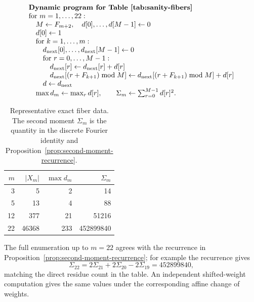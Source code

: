 \[
\begin{array}{l}
\text{\bf Dynamic program for Table~\ref{tab:sanity-fibers}}\\
\text{for }m=1,\ldots,22:\\
\quad M\leftarrow F_{m+2},\quad d[0],\ldots,d[M-1]\leftarrow0\\
\quad d[0]\leftarrow1\\
\quad \text{for }k=1,\ldots,m:\\
\quad\quad d_{\rm next}[0],\ldots,d_{\rm next}[M-1]\leftarrow0\\
\quad\quad \text{for }r=0,\ldots,M-1:\\
\quad\quad\quad d_{\rm next}[r]\leftarrow d_{\rm next}[r]+d[r]\\
\quad\quad\quad d_{\rm next}[(r+F_{k+1})\bmod M]
\leftarrow d_{\rm next}[(r+F_{k+1})\bmod M]+d[r]\\
\quad\quad d\leftarrow d_{\rm next}\\
\quad \max d_m\leftarrow \max_r d[r],\qquad
\Sigma_m\leftarrow\sum_{r=0}^{M-1}d[r]^2 .
\end{array}
\]

\begin{table}[t]
\centering
\caption{Representative exact fiber data. The second moment $\Sigma_m$ is the quantity in the discrete Fourier identity and Proposition~\ref{prop:second-moment-recurrence}.}
\label{tab:sanity-fibers}
\renewcommand{\arraystretch}{1.15}
\begin{tabular}{rrrr}
\toprule
$m$ & $|X_m|$ & $\max d_m$ & $\Sigma_m$ \\
\midrule
3 & 5 & 2 & 14 \\
5 & 13 & 4 & 88 \\
12 & 377 & 21 & 51216 \\
22 & 46368 & 233 & 452899840 \\
\bottomrule
\end{tabular}
\end{table}

The full enumeration up to $m=22$ agrees with the recurrence in Proposition~\ref{prop:second-moment-recurrence}; for example the recurrence gives
\[
\Sigma_{22}=2\Sigma_{21}+2\Sigma_{20}-2\Sigma_{19}=452899840,
\]
matching the direct residue count in the table. An independent shifted-weight
computation gives the same values under the corresponding affine change of
weights.
